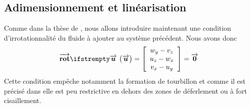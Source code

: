 \subsection{Adimensionnement et linéarisation}
\noindent Comme dans la thèse de \citet{Pons2018}, nous allons introduire maintenant une condition d'irrotationnalité du fluide à ajouter au système précédent. Nous avons donc 
\begin{equation}
	\rot[\velocity] =  \myvector{w_y- v_z}{ u_z- w_x}{ v_x- u_y}= \boldvec{0} \label{eq:irrotationnalite}
\end{equation}
Cette condition empêche notamment la formation de tourbillon et comme il est précisé dans \citet{Pons2018} elle est peu restrictive en dehors des zones de déferlement ou à fort cisaillement.\\
